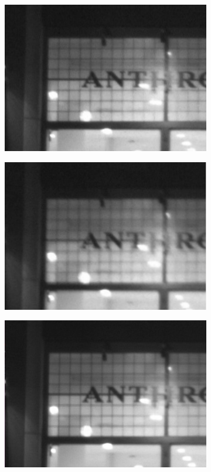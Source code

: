 \documentclass[a4paper,10pt]{report}
\begin{document}
\begin{figure}[h]
 
  \begin{subfigure}{0.32\textwidth}
    \includegraphics[width=0.9\linewidth]{ressource/detail_anthro1.png} 
    \label{fig:anthro1}
  \end{subfigure}
  \begin{subfigure}{0.32\textwidth}
    \includegraphics[width=0.9\linewidth]{ressource/detail_anthro3.png} 
    \label{fig:anthro3}
  \end{subfigure}
  \begin{subfigure}{0.32\textwidth}
    \includegraphics[width=0.9\linewidth]{ressource/detail_anthro_res.png} 

\end{subfigure}
\end{figure}
\end{document}
